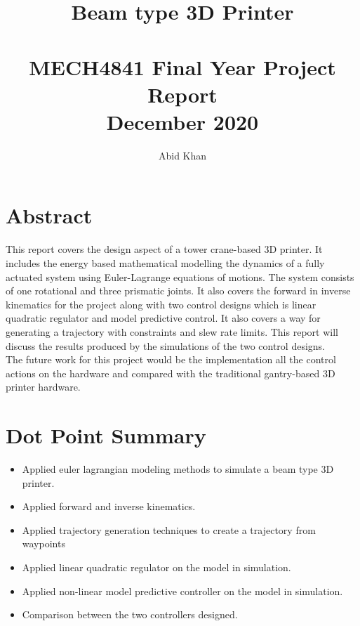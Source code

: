 \documentclass{UoNMCHA}
\numberwithin{equation}{section}
\begin{document}
	\title{Beam type 3D Printer \\ \ \\
		{\small MECH4841 Final Year Project Report  \\December 2020}}
	\author[UoNMCHA]{Abid Khan}
	\address[UoNMCHA]{
		Student of Mechatronics Engineering,\\
		The University of Newcastle, Callaghan, NSW 2308, AUSTRALIA \\
		Student Number: 3189548 \\
		E-mail: \href{mailto: c3189548@uon.edu.au}{\textsf{ c3189548@uon.edu.au}}}
	\maketitle
	\onecolumn
	
	\newpage
	\vspace{-5mm}
	\section*{Abstract}
	
	This report covers the design aspect of a tower crane-based 3D printer. It includes the energy based mathematical modelling the dynamics of a fully actuated system using Euler-Lagrange equations of motions. The system consists of one rotational and three prismatic joints. It also covers the forward in inverse kinematics for the project along with two control designs which is linear quadratic regulator and model predictive control. It also covers a way for generating a trajectory with constraints and slew rate limits. This report will discuss the results produced by the simulations of the two control designs. \\
	The future work for this project would be the implementation all the control actions on the hardware and compared with the traditional gantry-based 3D printer hardware.
	
	\newpage
	\vspace{-5mm}
	\section*{Dot Point Summary}
	
	\begin{itemize}
		\item Applied euler lagrangian modeling methods to simulate a beam type 3D printer.
		\item Applied forward and inverse kinematics.
		\item Applied trajectory generation techniques to create a trajectory from waypoints
		\item Applied linear quadratic regulator on the model in simulation.
		\item Applied non-linear model predictive controller on the model in simulation.
		\item Comparison between the two controllers designed.
		
		
		
	\end{itemize}
	\newpage
	\vspace{-2mm}
\end{document}
